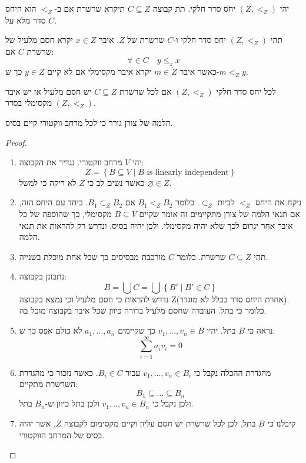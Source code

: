 \documentclass{tstextbook}
\begin{document}
\begin{definition}[שרשרת]
יהי \(\left( Z,<_{Z} \right)\) יחס סדר חלקי. תת קבוצה \(C\subseteq Z\) תיקרא שרשרת אם ב-\(<_{Z}\) הוא היחס סדר מלא על \(C\).

\end{definition}
\begin{definition}
תהי \((Z,<_{Z})\) יחס סדר חלקי ו-\(C\) שרשרת של \(Z\). איבר \(x \in Z\) יקרא חסם מלעיל של שרשרת \(C\) אם:
$$\forall \in C\quad y\leq_{z} x$$
כאשר איבר \(m \in Z\) יקרא איבר מקסימלי אם לא קיים \(y \in Z\) כך ש-\(m<_{Z}y\).

\end{definition}
\begin{definition}
לכל יחס סדר חלקי \((Z,<_{Z})\) אם לכל שרשרת \(C\subseteq Z\) יש חסם מלעיל אז יש איבר מקסימלי בסדר \((Z,<_{Z})\).

\end{definition}
\begin{proposition}
הלמה של צורן גורר כי לכל מרחב ווקטורי קיים בסיס.

\end{proposition}
\begin{proof}
  \begin{enumerate}
    \item יהי \(V\) מרחב ווקטורי. נגדיר את הקבוצה: 
$$Z=\left\{  B\subseteq V\mid B \text{ is linearly independent}  \right\}$$
כאשר נשים לב כי \(Z\) לא ריקה כי למשל \(\varnothing \in Z\).


    \item ניקח את היחס \(<_{Z}\) לביות \(\subset_{Z}\). כלומר \(B_{1}<_{Z}B_{2}\) אם \(B_{1}\subset_{Z}B_{2}\). ביחד עם היחס הזה, אם תנאי הלמה של צורן מתקיימים זה אומר שקיים \(B\subseteq V\) מקסימלי, כך שהוספה של כל איבר אחר יגרום לכך שלא יהיה מקסימלי. ולכן יהיה בסיס, ונדרש רק להראות את תנאי הלמה. 


    \item תהי \(C\subseteq Z\) שרשרת. כלומר \(C\) מורכבת מבסיסים כך שכל אחת מוכלת בשנייה. 


    \item נתבונן בקבוצה: 
$$B=\bigcup C=\bigcup \left\{  B'\mid B' \in C  \right\}$$
נדרש להראות כי חסם מלעיל וכי נמצא בקבוצה Z(אחרת היחס סדר בכלל לא מוגדר). כלומר כי בתל. העובדה שחסם מלעיל ברורה כיוון שכל איבר בקבוצה מוכל בה.


    \item נראה כי \(B\) בתל. יהיו \(v_{1},\dots,v_{n}\in B\) כך שקיימים \(a_{1},\dots,a_{n}\) לא כולם אפס כך ש: 
$$\sum_{i=1}^{\infty}a_{i}v_{i}=0$$


    \item מהגדרת ההכלה נקבל כי \(v_{1},\dots,v_{n}\in B_{i}\) עבור \(B_{i}\in C\). כאשר נזכור כי מהגדרת השרשרת מתקיים: 
$$B_{1}\subseteq \dots \subseteq B_{n}$$
ולכן נקבל כי \(v_{1},..,v_{n}\in B_{n}\) ולכן בתל כיוון ש-\(B_{n}\) בתל.


    \item קיבלנו כי \(B\) בתל, לכן לכל שרשרת יש חסם עליון וקיים מקסימום לקבוצה \(Z\), אשר יהיה בסיס של המרחב הווקטורי. 


  \end{enumerate}
\end{proof}
\end{document}
